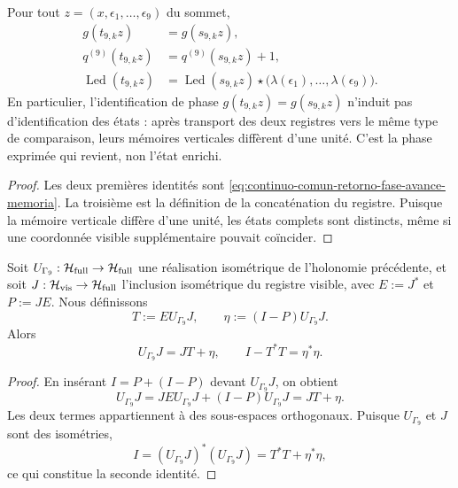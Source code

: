 \begin{proposition}
\label{prop:continuo-comun-gamma9-retorno-memoria}
Pour tout \(z=(x,\epsilon_1,\ldots,\epsilon_9)\) du sommet,
\begin{align}
 g(t_{9,k}z)&=g(s_{9,k}z),
 \label{eq:continuo-comun-gamma9-retorno-fase}\\
 q^{(9)}(t_{9,k}z)&=q^{(9)}(s_{9,k}z)+1,
 \label{eq:continuo-comun-gamma9-avance-memoria}\\
 \operatorname{Led}(t_{9,k}z)
 &=\operatorname{Led}(s_{9,k}z)\star
   \bigl(\lambda(\epsilon_1),\ldots,\lambda(\epsilon_9)\bigr).
 \label{eq:continuo-comun-gamma9-ledger}
\end{align}
En particulier, l'identification de phase \(g(t_{9,k}z)=g(s_{9,k}z)\) n'induit pas d'identification des états : après transport des deux registres vers le même type de comparaison, leurs mémoires verticales diffèrent d'une unité. C'est la phase exprimée qui revient, non l'état enrichi.
\end{proposition}

\begin{proof}
Les deux premières identités sont \eqref{eq:continuo-comun-retorno-fase-avance-memoria}. La troisième est la définition de la concaténation du registre. Puisque la mémoire verticale diffère d'une unité, les états complets sont distincts, même si une coordonnée visible supplémentaire pouvait coïncider.
\end{proof}

\begin{proposition}
\label{prop:continuo-comun-gamma9-compresion-isometrica}
Soit \(U_{\Gamma_9}:\mathcal H_{\rm full}\to\mathcal H_{\rm full}\) une réalisation isométrique de l'holonomie précédente, et soit \(J:\mathcal H_{\rm vis}\to\mathcal H_{\rm full}\) l'inclusion isométrique du registre visible, avec \(E:=J^*\) et \(P:=JE\). Nous définissons
\begin{equation}
\label{eq:continuo-comun-gamma9-compresion-datos}
 T:=EU_{\Gamma_9}J,\qquad
 \eta:=(I-P)U_{\Gamma_9}J.
\end{equation}
Alors
\begin{equation}
\label{eq:continuo-comun-gamma9-compresion}
 \boxed{\;
 U_{\Gamma_9}J=JT+\eta,\qquad
 I-T^*T=\eta^*\eta.
 \;}
\end{equation}
\end{proposition}

\begin{proof}
En insérant \(I=P+(I-P)\) devant \(U_{\Gamma_9}J\), on obtient
\[
 U_{\Gamma_9}J
 =JEU_{\Gamma_9}J+(I-P)U_{\Gamma_9}J
 =JT+\eta.
\]
Les deux termes appartiennent à des sous-espaces orthogonaux. Puisque \(U_{\Gamma_9}\) et \(J\) sont des isométries,
\[
 I=(U_{\Gamma_9}J)^*(U_{\Gamma_9}J)
   =T^*T+\eta^*\eta,
\]
ce qui constitue la seconde identité.
\end{proof}

